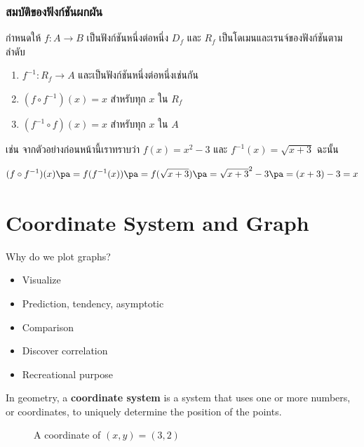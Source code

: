 \begin{frame}[t]
\frametitle{สมบัติของฟังก์ชันผกผัน}
\begin{prop}{}{}
กำหนดให้ $f: A \to B$ เป็นฟังก์ชันหนึ่งต่อหนึ่ง $D_f$ และ $R_f$ เป็นโดเมนและเรนจ์ของฟังก์ชันตามลำดับ
\begin{enumerate}
\item $f^{-1}: R_f \to A$ และเป็นฟังก์ชันหนึ่งต่อหนึ่งเช่นกัน
\item $(f \circ f^{-1}) (x) = x$ สำหรับทุก $x$ ใน $R_f$
\item $(f^{-1} \circ f)(x) = x$ สำหรับทุก $x$ ใน $A$
\end{enumerate}
\end{prop}
เช่น จากตัวอย่างก่อนหน้านี้เราทราบว่า $f(x) = x^2-3$ และ $f^{-1}(x) = \sqrt{x+3}$ ฉะนั้น
\begin{slide}
\[(f \circ f^{-1})(x) \pa = f( f^{-1}(x)) \pa = f( \sqrt{x+3} ) \pa = \sqrt{x+3}^2 - 3 \pa = (x+3) - 3 = x\]
\end{slide}
\end{frame}
\fi

\section[Coordinate]{Coordinate System and Graph}
\frame{\sectionpage}

\begin{frame}
\begin{block}{Why do we plot graphs?}
\begin{itemize}
\item Visualize \pause 
\item Prediction, tendency, asymptotic \pause
\item Comparison \pause
\item Discover correlation \pause
\item Recreational purpose \pause
\end{itemize}
\end{block}

\begin{defn}{}{}
In geometry, a \textbf{coordinate system} is a system that uses one or more numbers, or coordinates, to uniquely determine the position of the points.
\end{defn}
\end{frame}

\begin{frame}
\begin{figure}[h!]
\caption{A coordinate of $(x,y) = (3,2)$}
\end{figure}
\end{frame}

